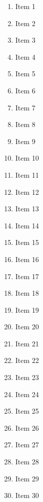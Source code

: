 \documentclass[12pt,a4paper]{article}
\begin{document}
\begin{enumerate}

	\item Item 1
	\item Item 2
	\item Item 3
	\item Item 4
	\item Item 5
	\item Item 6
	\item Item 7
	\item Item 8
	\item Item 9
	\item Item 10
	\item Item 11
	\item Item 12
	\item Item 13
	\item Item 14
	\item Item 15
	\item Item 16
	\item Item 17
	\item Item 18
	\item Item 19
	\item Item 20
	\item Item 21
	\item Item 22
	\item Item 23
	\item Item 24
	\item Item 25
	\item Item 26
	\item Item 27
	\item Item 28
	\item Item 29
	\item Item 30


\end{enumerate}
\end{document}
